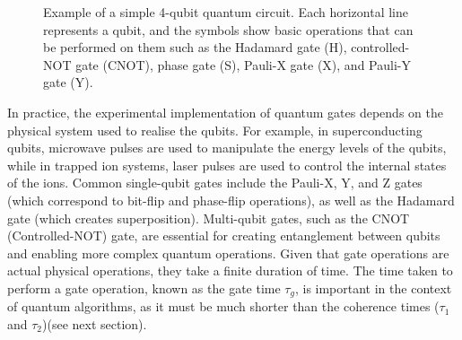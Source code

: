 \documentclass{elbioimp2}
\begin{document}
\begin{figure}[h]
  \centering
  \caption{Example of a simple 4-qubit quantum circuit. Each horizontal line represents a qubit, and the symbols show basic operations that can be performed on them such as the Hadamard gate (H), controlled-NOT gate (CNOT), phase gate (S), Pauli-X gate (X), and Pauli-Y gate (Y).}
\end{figure}

In practice, the experimental implementation of quantum gates depends on the physical system used to realise the qubits. For example, in superconducting qubits, microwave pulses are used to manipulate the energy levels of the qubits, while in trapped ion systems, laser pulses are used to control the internal states of the ions. Common single-qubit gates include the Pauli-X, Y, and Z gates (which correspond to bit-flip and phase-flip operations), as well as the Hadamard gate (which creates superposition). Multi-qubit gates, such as the CNOT (Controlled-NOT) gate, are essential for creating entanglement between qubits and enabling more complex quantum operations. Given that gate operations are actual physical operations, they take a finite duration of time. The time taken to perform a gate operation, known as the gate time $\tau_g$, is important in the context of quantum algorithms, as it must be much shorter than the coherence times ($\tau_1$ and $\tau_2$)(see next section).
\end{document}
